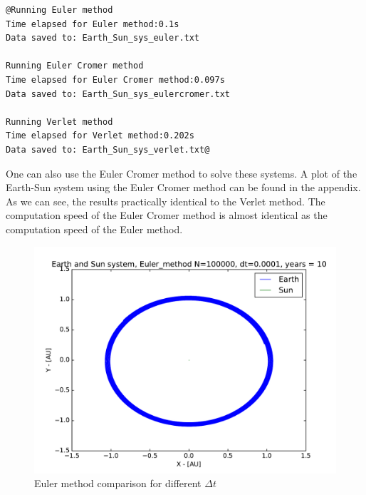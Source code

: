 \documentclass[12pt]{article}
\begin{document}
\begin{lstlisting}
@Running Euler method
Time elapsed for Euler method:0.1s
Data saved to: Earth_Sun_sys_euler.txt

Running Euler Cromer method
Time elapsed for Euler Cromer method:0.097s
Data saved to: Earth_Sun_sys_eulercromer.txt

Running Verlet method
Time elapsed for Verlet method:0.202s
Data saved to: Earth_Sun_sys_verlet.txt@
\end{lstlisting}

One can also use the Euler Cromer method to solve these systems. A plot of the Earth-Sun system using the Euler Cromer method can be found in the appendix. As we can see, the results practically identical to the Verlet method. The computation speed of the Euler Cromer method is almost identical as the computation speed of the Euler method.

\begin{figure}[!h]
\centering
\includegraphics[width=\linewidth]{Plots/Earth_Sun_Euler_method.pdf}
\caption{Euler method comparison for different $\Delta t$}
\label{fig:balle}
\end{figure}
\end{document}
